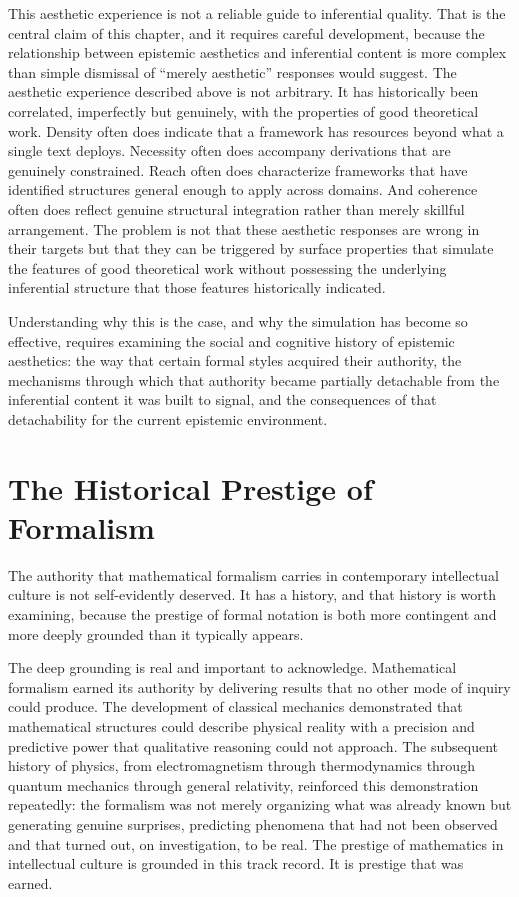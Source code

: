 \documentclass[12pt, openright, twoside]{book}
\begin{document}
This aesthetic experience is not a reliable guide to inferential quality. That
is the central claim of this chapter, and it requires careful development,
because the relationship between epistemic aesthetics and inferential content
is more complex than simple dismissal of ``merely aesthetic'' responses would
suggest. The aesthetic experience described above is not arbitrary. It has
historically been correlated, imperfectly but genuinely, with the properties
of good theoretical work. Density often does indicate that a framework has
resources beyond what a single text deploys. Necessity often does accompany
derivations that are genuinely constrained. Reach often does characterize
frameworks that have identified structures general enough to apply across
domains. And coherence often does reflect genuine structural integration rather
than merely skillful arrangement. The problem is not that these aesthetic
responses are wrong in their targets but that they can be triggered by surface
properties that simulate the features of good theoretical work without possessing
the underlying inferential structure that those features historically indicated.

Understanding why this is the case, and why the simulation has become so
effective, requires examining the social and cognitive history of epistemic
aesthetics: the way that certain formal styles acquired their authority,
the mechanisms through which that authority became partially detachable from
the inferential content it was built to signal, and the consequences of that
detachability for the current epistemic environment.

\section{The Historical Prestige of Formalism}

The authority that mathematical formalism carries in contemporary intellectual
culture is not self-evidently deserved. It has a history, and that history
is worth examining, because the prestige of formal notation is both more
contingent and more deeply grounded than it typically appears.

The deep grounding is real and important to acknowledge. Mathematical formalism
earned its authority by delivering results that no other mode of inquiry could
produce. The development of classical mechanics demonstrated that mathematical
structures could describe physical reality with a precision and predictive power
that qualitative reasoning could not approach. The subsequent history of physics,
from electromagnetism through thermodynamics through quantum mechanics through
general relativity, reinforced this demonstration repeatedly: the formalism was
not merely organizing what was already known but generating genuine surprises,
predicting phenomena that had not been observed and that turned out, on
investigation, to be real. The prestige of mathematics in intellectual culture
is grounded in this track record. It is prestige that was earned.
\end{document}
